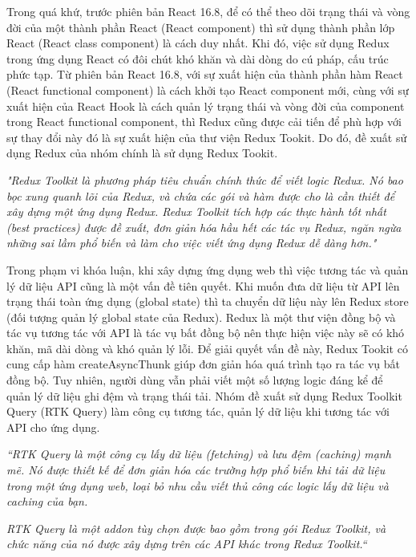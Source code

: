 Trong quá khứ, trước phiên bản React 16.8, để có thể theo dõi trạng thái và vòng đời của một thành phần React (React component) thì sử dụng thành phần lớp React (React class component) là cách duy nhất.
Khi đó, việc sử dụng Redux trong ứng dụng React có đôi chút khó khăn và dài dòng do cú pháp, cấu trúc phức tạp.
Từ phiên bản React 16.8, với sự xuất hiện của thành phần hàm React (React functional component) là cách khởi tạo React component mới, cùng với sự xuất hiện của React Hook là cách quản lý trạng thái và vòng đời của component trong React functional component, thì Redux cũng được cải tiến để phù hợp với sự thay đổi này đó là sự xuất hiện của thư viện Redux Tookit.
Do đó, đề xuất sử dụng Redux của nhóm chính là sử dụng Redux Tookit.
\par

\textit{"Redux Toolkit là phương pháp tiêu chuẩn chính thức để viết logic Redux.
  Nó bao bọc xung quanh lõi của Redux, và chứa các gói và hàm được cho là cần thiết để xây dựng một ứng dụng Redux.
  Redux Toolkit tích hợp các thực hành tốt nhất (best practices) được đề xuất, đơn giản hóa hầu hết các tác vụ Redux, ngăn ngừa những sai lầm phổ biến và làm cho việc viết ứng dụng Redux dễ dàng hơn."} \cite{chap4bib1}
\par

Trong phạm vi khóa luận, khi xây dựng ứng dụng web thì việc tương tác và quản lý dữ liệu API cũng là một vấn đề tiên quyết.
Khi muốn đưa dữ liệu từ API lên trạng thái toàn ứng dụng (global state) thì ta chuyển dữ liệu này lên Redux store (đối tượng quản lý global state của Redux).
Redux là một thư viện đồng bộ và tác vụ tương tác với API là tác vụ bất đồng bộ nên thực hiện việc này sẽ có khó khăn, mã dài dòng và khó quản lý lỗi.
Để giải quyết vấn đề này, Redux Tookit có cung cấp hàm createAsyncThunk giúp đơn giản hóa quá trình tạo ra tác vụ bất đồng bộ.
Tuy nhiên, người dùng vẫn phải viết một số lượng logic đáng kể để quản lý dữ liệu ghi đệm và trạng thái tải.
Nhóm đề xuất sử dụng Redux Toolkit Query (RTK Query) làm công cụ tương tác, quản lý dữ liệu khi tương tác với API cho ứng dụng.
\par

\textit{“RTK Query là một công cụ lấy dữ liệu (fetching) và lưu đệm (caching) mạnh mẽ.
  Nó được thiết kế để đơn giản hóa các trường hợp phổ biến khi tải dữ liệu trong một ứng dụng web, loại bỏ nhu cầu viết thủ công các logic lấy dữ liệu và caching của bạn.}
\par

\textit{RTK Query là một addon tùy chọn được bao gồm trong gói Redux Toolkit, và chức năng của nó được xây dựng trên các API khác trong Redux Toolkit.“} \cite{chap4bib2}
\par

